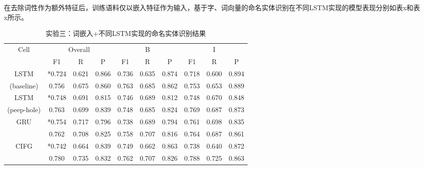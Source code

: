 在去除词性作为额外特征后，训练语料仅以嵌入特征作为输入，基于字、词向量的命名实体识别在不同LSTM实现的模型表现分别如表x和表x所示。
\begin{table}[H]
    \centering
    \caption{实验三：词嵌入+不同LSTM实现的命名实体识别结果}
    \begin{tabular}{cccccccccc}
        \toprule
            \multirow{2}{*}{Cell} &\multicolumn{3}{c}{Overall} &\multicolumn{3}{c}{B} &\multicolumn{3}{c}{I}\\
            \cmidrule(lr){2-4} \cmidrule(lr){5-7} \cmidrule(lr){8-10}
            & F1 & R & P & F1 & R & P & F1 & R & P\\
        \midrule
            LSTM & *0.724 & 0.621 & 0.866 & 0.736 & 0.635 & 0.874 & 0.718 & 0.600 & 0.894\\
            (baseline) & 0.756 & 0.675 & 0.860 & 0.763 & 0.685 & 0.862 & 0.753 & 0.653 & 0.889\\
            LSTM & *0.748 & 0.691 & 0.815 & 0.746 & 0.689 & 0.812 & 0.748 & 0.670 & 0.848\\
            (peep-hole) & 0.763 & 0.699 & 0.839 & 0.748 & 0.685 & 0.824 & 0.769 & 0.687 & 0.873\\
            \multirow{2}{2cm}{GRU} & *0.754 & 0.717 & 0.796 & 0.738 & 0.689 & 0.794 & 0.761 & 0.698 & 0.835\\
                                 & 0.762 & 0.708 & 0.825 & 0.758 & 0.707 & 0.816 & 0.764 & 0.687 & 0.861\\
            \multirow{2}{2cm}{CIFG} & *0.742 & 0.664 & 0.839 & 0.749 & 0.662 & 0.863 & 0.738 & 0.640 & 0.872\\
                                  & 0.780 & 0.735 & 0.832 & 0.762 & 0.707 & 0.826 & 0.788 & 0.725 & 0.863\\
        \bottomrule
    \end{tabular}
    \label{tab:tab1}
\end{table}


